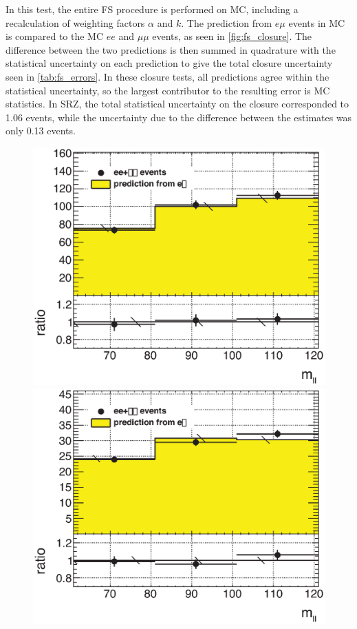 In this test, the entire \ac{FS} procedure is performed on \ttbar \ac{MC}, including a recalculation of weighting factors $\alpha$ and $k$. The prediction from $e\mu$ events in \ac{MC} is compared to the \ac{MC} $ee$ and $\mu\mu$ events, as seen in \autoref{fig:fs_closure}. The difference between the two predictions is then summed in quadrature with the statistical uncertainty on each prediction to give the total closure uncertainty seen in \autoref{tab:fs_errors}. In these closure tests, all predictions agree within the statistical uncertainty, so the largest contributor to the resulting error is \ac{MC} statistics. In SRZ, the total statistical uncertainty on the closure corresponded to 1.06 events, while the uncertainty due to the difference between the estimates was only 0.13 events. 

\begin{centering}
\begin{figure}[!hbt]
\myfloatalign
\includegraphics[width=.85\linewidth]{figures/fs/ee+mm_ratio_mll_VRZ_widened.eps}
\includegraphics[width=.85\linewidth]{figures/fs/ee+mm_ratio_mll_SRZ_widened.eps}

\end{figure}
\end{centering}
